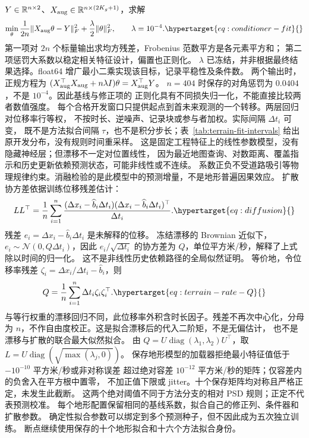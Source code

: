 \(Y\in\mathbb{R}^{n\times2}\)、\(X_{\rm aug}\in\mathbb{R}^{n\times(2K_g+1)}\)，求解
\begin{equation}
\min_\theta\frac{1}{2n}\|X_{\rm aug}\theta-Y\|_F^2
 +\frac{\lambda}{2}\|\theta\|_F^2,\qquad\lambda=10^{-4}.
\label{eq:conditioner-fit}\hypertarget{eq:conditioner-fit}{}
\end{equation}
第一项对 \(2n\) 个标量输出求均方残差，Frobenius 范数平方是各元素平方和；
第二项惩罚大系数以稳定相关特征设计，偏置也正则化。
\(\lambda\) 已冻结，并非根据最终结果选择。float64 增广最小二乘实现该目标，记录平稳性及条件数。
两个输出时，正规方程为
\((X_{\rm aug}^\top X_{\rm aug}+n\lambda I)\theta=X_{\rm aug}^\top Y\)。
\(n=404\) 时保存的对角惩罚为 \(0.0404\)，不是 \(10^{-4}\)。因此基线与修正项的
正则化具有不同损失归一化，不能直接比较两者数值强度。
每个合格开发窗口只提供起点到首未来观测的一个转移。两层回归对位移率行等权，
不按时长、逆噪声、记录块或参与者加权。实际间隔 \(\Delta t_i\) 可变，
既不是方法拟合间隔 \(\tau\)，也不是积分步长；表~\ref{tab:terrain-fit-intervals}
给出原开发分布，没有规则时间重采样。
这是固定工程特征上的线性参数模型，没有隐藏神经层；但漂移不一定对位置线性，
因为最近地图查询、对数距离、覆盖指示和历史更新依赖预测状态，可能非线性或不连续。
系数正负不受道路吸引等物理规律约束。消融检验的是此模型中的预测增量，不是地形普遍因果效应。
扩散协方差依据训练位移残差估计：
\begin{equation}
LL^\top=\frac1n\sum_{i=1}^{n}
\frac{(\Delta x_i-\widehat b_i\Delta t_i)(\Delta x_i-\widehat b_i\Delta t_i)^\top}{\Delta t_i}.
\label{eq:diffusion}\hypertarget{eq:diffusion}{}
\end{equation}
残差 \(e_i=\Delta x_i-\widehat b_i\Delta t_i\) 是未解释的位移。
冻结漂移的 Brownian 近似下，\(e_i\sim\mathcal N(0,Q\Delta t_i)\)，因此
\(e_i/\sqrt{\Delta t_i}\) 的协方差为 \(Q\)，单位平方米/秒，解释了上式除以时间的归一化。
这不是非线性历史依赖路径的全局似然证明。
等价地，令位移率残差 \(\zeta_i=\Delta x_i/\Delta t_i-\widehat b_i\)，则
\begin{equation}
Q=\frac1n\sum_{i=1}^n\Delta t_i\zeta_i\zeta_i^\top.
\label{eq:terrain-rate-Q}\hypertarget{eq:terrain-rate-Q}{}
\end{equation}
与等行权重的漂移回归不同，此位移率外积含时长因子。残差不再次中心化，分母为
\(n\)，不作自由度校正。这是拟合漂移后的代入二阶矩，不是无偏估计，
也不是漂移与扩散的联合最大似然拟合。
由 \(Q=U\operatorname{diag}(\lambda_1,\lambda_2)U^\top\)，取
\(L=U\operatorname{diag}(\sqrt{\max(\lambda_j,0)})\)。
保存地形模型的加载器拒绝最小特征值低于 \(-10^{-10}\) 平方米/秒或非对称误差
超过绝对容差 \(10^{-12}\) 平方米/秒的矩阵；仅容差内的负舍入在平方根中置零，
不加正值下限或 jitter。十个保存矩阵均对称且严格正定，未发生此截断。
这两个绝对阈值不同于方法分支的相对 PSD 规则；正定不代表预测校准。
每个地形配置保留相同的基线系数，拟合自己的修正列、条件器和扩散参数。
确定性拟合参数可以绑定到多个预测种子，但不因此成为五次独立训练。
断点继续使用保存的十个地形拟合和十六个方法拟合身份。

